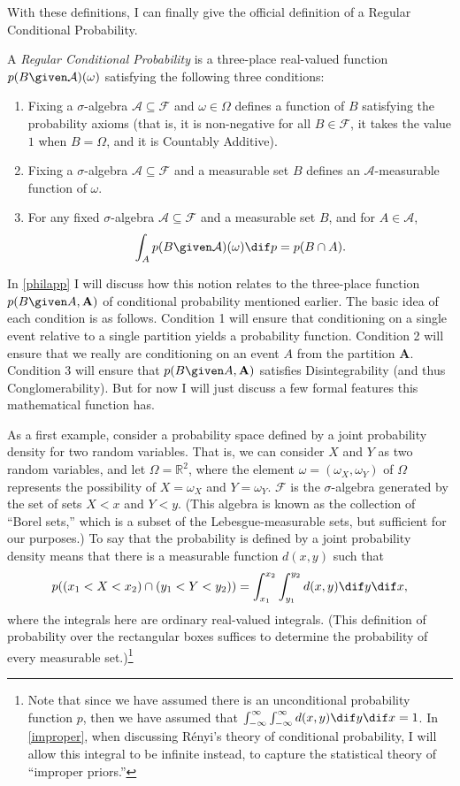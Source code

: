 With these definitions, I can finally give the official definition of a Regular Conditional Probability.
\begin{definition}\label{rcd}
A \emph{Regular Conditional Probability} is a three-place real-valued function $p(B \given \mathcal{A})(\omega)$ satisfying the following three conditions:\begin{enumerate}
\item Fixing a $\sigma$-algebra $\mathcal{A}\subseteq\mathcal{F}$ and $\omega\in\Omega$ defines a function of $B$ satisfying the probability axioms (that is, it is non-negative for all $B\in\mathcal{F}$, it takes the value $1$ when $B=\Omega$, and it is Countably Additive).
\item Fixing a $\sigma$-algebra $\mathcal{A}\subseteq\mathcal{F}$ and a measurable set $B$ defines an $\mathcal{A}$-measurable function of $\omega$.
\item For any fixed $\sigma$-algebra $\mathcal{A}\subseteq\mathcal{F}$ and a measurable set $B$, and for $A\in\mathcal{A}$, $$\int_A p(B \given \mathcal{A})(\omega) \dif p=p(B\cap A).$$
\end{enumerate}
\end{definition}
In \autoref{philapp} I will discuss how this notion relates to the three-place function $p(B \given A,\mathbf{A})$ of conditional probability mentioned earlier. The basic idea of each condition is as follows. Condition 1 will ensure that conditioning on a single event relative to a single partition yields a  probability function. Condition 2 will ensure that we really are conditioning on an event $A$ from the partition $\mathbf{A}$. Condition 3 will ensure that $p(B \given A,\mathbf{A})$ satisfies Disintegrability (and thus Conglomerability). But for now I will just discuss a few formal features this mathematical function has.

As a first example, consider a probability space defined by a joint probability density for two random variables. That is, we can consider $X$ and $Y$ as two random variables, and let $\Omega=\mathbb{R}^2$, where the element $\omega=(\omega_X,\omega_Y)$ of $\Omega$ represents the possibility of $X=\omega_X$ and $Y=\omega_Y$. $\mathcal{F}$ is the $\sigma$-algebra generated by the set of sets $X<x$ and $Y<y$. (This algebra is known as the collection of ``Borel sets,'' which is a subset of the Lebesgue-measurable sets, but sufficient for our purposes.) To say that the probability is defined by a joint probability density means that there is a measurable function $d(x,y)$ such that
$$p((x_1<X<x_2)\cap(y_1<Y<y_2))=\int_{x_1}^{x_2}\int_{y_1}^{y_2} d(x,y) \dif y \dif x,$$
where the integrals here are ordinary real-valued integrals. (This definition of probability over the rectangular boxes suffices to determine the probability of every measurable set.)\footnote{Note that since we have assumed there is an unconditional probability function $p$, then we have assumed that $\int_{-\infty}^{\infty}\int_{-\infty}^{\infty}d(x,y) \dif y \dif x=1$. In \autoref{improper}, when discussing R\'{e}nyi's theory of conditional probability, I will allow this integral to be infinite instead, to capture the statistical theory of ``improper priors.''}

